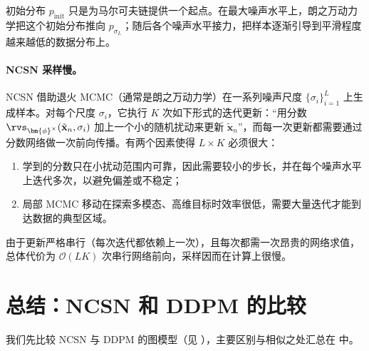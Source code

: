 初始分布 $p_{\mathrm{init}}$ 只是为马尔可夫链提供一个起点。在最大噪声水平上，朗之万动力学把这个初始分布推向 $p_{\sigma_L}$；随后各个噪声水平接力，把样本逐渐引导到平滑程度越来越低的数据分布上。

\paragraph{NCSN 采样慢。}
NCSN 借助退火 MCMC（通常是朗之万动力学）在一系列噪声尺度 $\{\sigma_i\}_{i=1}^L$ 上生成样本。对每个尺度 $\sigma_i$，它执行 $K$ 次如下形式的迭代更新：“用分数 $\rvs_{\bm{\phi}^\times}(\tilde{\mathbf{x}}_n,\sigma_i)$ 加上一个小的随机扰动来更新 $\tilde{\mathbf{x}}_n$”，而每一次更新都需要通过分数网络做一次前向传播。有两个因素使得 $L \times K$ 必须很大：
\begin{enumerate}
    \item[(i)]  学到的分数只在小扰动范围内可靠，因此需要较小的步长，并在每个噪声水平上迭代多次，以避免偏差或不稳定；
    \item[(ii)]  局部 MCMC 移动在探索多模态、高维目标时效率很低，需要大量迭代才能到达数据的典型区域。
\end{enumerate}
由于更新严格串行（每次迭代都依赖上一次），且每次都需一次昂贵的网络求值，总体代价为 $\mathcal{O}(LK)$ 次串行网络前向，采样因而在计算上很慢。


\section{总结：NCSN 和 DDPM 的比较}

我们先比较 NCSN 与 DDPM 的图模型（见 ），主要区别与相似之处汇总在  中。


